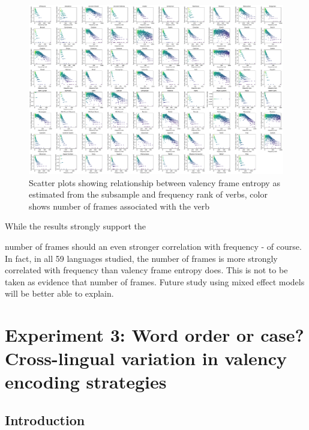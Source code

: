 \begin{figure}
  \centering
  \includegraphics[width=\textwidth]{figures/exp2/joint_entropy_freq_subsample.pdf}
  \caption{Scatter plots showing relationship between valency frame entropy as estimated from the subsample and frequency rank of verbs, color shows number of frames associated with the verb}
  \label{fig:joint_entropy_freq_subsample}
\end{figure}

While the results strongly support the 



number of frames should an even stronger correlation with frequency - of course. In fact, in all 59 languages studied, the number of frames is more strongly correlated with frequency than valency frame entropy does. This is not to be taken as evidence that number of frames. Future study using mixed effect models will be better able to explain.

\section{Experiment 3: Word order or case? Cross-lingual variation in valency encoding strategies}\label{sec:exp3-ablation}
\subsection{Introduction}

